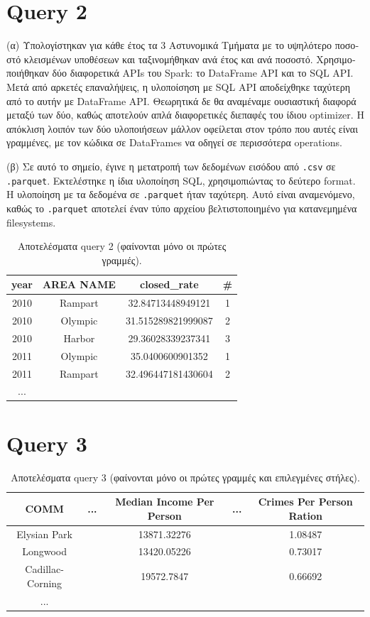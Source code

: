 \documentclass[a4paper,12pt]{article}
\begin{document}
\begin{otherlanguage}{greek}
\section*{Query 2}
	\FloatBarrier
	\par{(α)} Υπολογίστηκαν για κάθε έτος τα 3 Αστυνομικά Τμήματα με το υψηλότερο
	ποσοστό κλεισμένων υποθέσεων και ταξινομήθηκαν ανά έτος και ανά ποσοστό.
	Χρησιμοποιήθηκαν δύο διαφορετικά APIs του Spark: το DataFrame API και το SQL
	API. Μετά από αρκετές επαναλήψεις, η υλοποίσηση με SQL API αποδείχθηκε 
	ταχύτερη από το αυτήν με DataFrame API. Θεωρητικά δε θα αναμέναμε ουσιαστική
	διαφορά μεταξύ των δύο, καθώς αποτελούν απλά διαφορετικές διεπαφές του ίδιου
	optimizer. Η απόκλιση λοιπόν των δύο υλοποιήσεων μάλλον οφείλεται στον τρόπο
	που αυτές είναι γραμμένες, με τον κώδικα σε DataFrames να οδηγεί σε περισσότερα
	operations.
	\par{(β)} Σε αυτό το σημείο, έγινε η μετατροπή των δεδομένων εισόδου από 
	\texttt{.csv} σε \texttt{.parquet}. Εκτελέστηκε η ίδια υλοποίηση SQL,
	χρησιμοπιώντας το δεύτερο format. Η υλοποίηση με τα δεδομένα σε
	\texttt{.parquet} ήταν ταχύτερη. Αυτό είναι αναμενόμενο, καθώς το 
	\texttt{.parquet} αποτελεί έναν τύπο αρχείου βελτιστοποιημένο για κατανεμημένα
	filesystems.
	\begin{table}[h]
		\centering
		\begin{tabular}{cccc}
			year & AREA NAME & closed\_rate & \# \\
			\hline
			2010 & Rampart & 32.84713448949121 & 1 \\
			2010 & Olympic & 31.515289821999087 & 2 \\
			2010 & Harbor & 29.36028339237341 & 3 \\
			2011 & Olympic & 35.0400600901352 & 1 \\
			2011 & Rampart & 32.496447181430604 & 2 \\
			...
		\end{tabular}
		\caption{Aποτελέσματα query 2 (φαίνονται μόνο οι 
		πρώτες γραμμές).}
	\end{table}
	\FloatBarrier

\section*{Query 3}
	\FloatBarrier
	\lipsum[3] %
	\begin{table}[h]
		\centering
		\begin{tabular}{ccccc}
			COMM & ... & Median Income Per Person & ... & 
			Crimes Per Person Ration \\
			\hline
			Elysian Park & & 13871.32276 & & 1.08487 \\ 
			Longwood & & 13420.05226 & & 0.73017 \\
			Cadillac-Corning & & 19572.7847 & & 0.66692 \\
			...
		\end{tabular}
		\caption{Aποτελέσματα query 3 (φαίνονται μόνο οι 
		πρώτες γραμμές και επιλεγμένες στήλες).}
	\end{table}
	\FloatBarrier


\end{otherlanguage}
\end{document}
